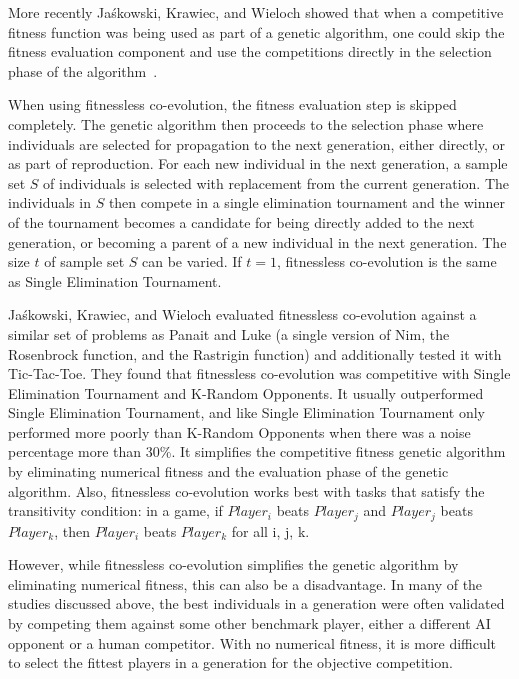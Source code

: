 More recently Ja\'{s}kowski, Krawiec, and Wieloch showed that when a competitive
fitness function was being used as part of a genetic algorithm, one could skip
the fitness evaluation component and use the competitions directly in the
selection phase of the algorithm~\cite{Jaskowski:2008:FC:1389095.1389161}.

When using fitnessless co-evolution, the fitness evaluation step is skipped
completely. The genetic algorithm then proceeds to the selection phase where
individuals are selected for propagation to the next generation, either
directly, or as part of reproduction. For each new individual in the next
generation, a sample set \(S\) of individuals is selected with replacement from
the current generation. The individuals in \(S\) then compete in a single
elimination tournament and the winner of the tournament becomes a candidate for
being directly added to the next generation, or becoming a parent of a new
individual in the next generation. The size \(t\) of sample set \(S\) can be
varied. If \(t=1\), fitnessless co-evolution is the same as Single Elimination
Tournament.

Ja\'{s}kowski, Krawiec, and Wieloch evaluated fitnessless co-evolution against a
similar set of problems as Panait and Luke (a single version of Nim, the
Rosenbrock function, and the Rastrigin function) and additionally tested it with
Tic-Tac-Toe. They found that fitnessless co-evolution was competitive with
Single Elimination Tournament and K-Random Opponents. It usually outperformed
Single Elimination Tournament, and like Single Elimination Tournament only
performed more poorly than K-Random Opponents when there was a noise percentage
more than 30\%. It simplifies the competitive fitness genetic algorithm by
eliminating numerical fitness and the evaluation phase of the genetic algorithm.
Also, fitnessless co-evolution works best with tasks that satisfy the
transitivity condition: in a game, if \(Player_{i}\) beats \(Player_{j}\) and
\(Player_{j}\) beats \(Player_{k}\), then \(Player_{i}\) beats \(Player_{k}\)
for all i, j, k.

However, while fitnessless co-evolution simplifies the genetic algorithm by
eliminating numerical fitness, this can also be a disadvantage. In many of the
studies discussed above, the best individuals in a generation were often
validated by competing them against some other benchmark player, either a
different AI opponent or a human competitor. With no numerical fitness, it is
more difficult to select the fittest players in a generation for the objective
competition.

